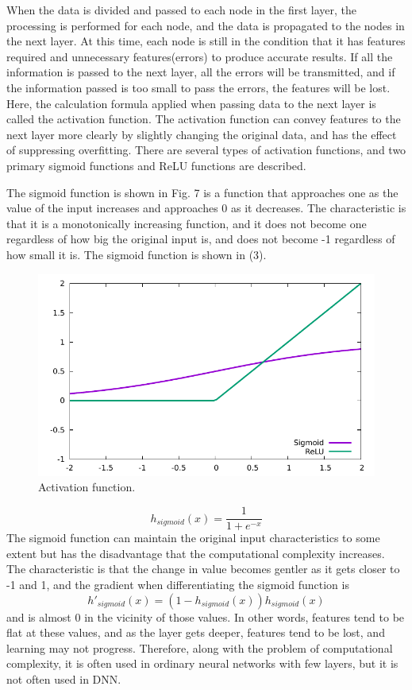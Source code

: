 When the data is divided and passed to each node in the first layer, the processing is performed for each node, and the data is propagated to the nodes in the next layer. At this time, each node is still in the condition that it has features required and unnecessary features(errors) to produce accurate results. If all the information is passed to the next layer, all the errors will be transmitted, and if the information passed is too small to pass the errors, the features will be lost. Here, the calculation formula applied when passing data to the next layer is called the activation function. The activation function can convey features to the next layer more clearly by slightly changing the original data, and has the effect of suppressing overfitting. There are several types of activation functions, and two primary sigmoid functions and ReLU functions are described. 

The sigmoid function is shown in Fig. 7 is a function that approaches one as the value of the input increases and approaches 0 as it decreases. The characteristic is that it is a monotonically increasing function, and it does not become one regardless of how big the original input is, and does not become -1 regardless of how small it is. The sigmoid function is shown in (3).
\begin{figure}[t]
\begin{center}
\includegraphics[width=0.8\linewidth]{fig/act.pdf}
\end{center}
\caption{Activation function.}
\vspace*{-3pt}
\end{figure}
\begin{equation}
h_{sigmoid}(x)=\frac{1}{1+e^{-x}}
\end{equation}
The sigmoid function can maintain the original input characteristics to some extent but has the disadvantage that the computational complexity increases. The characteristic is that the change in value becomes gentler as it gets closer to -1 and 1, and the gradient when differentiating the sigmoid function is 
\begin{equation}
h'_{sigmoid}(x)=(1-h_{sigmoid}(x))h_{sigmoid}(x)
\end{equation}
and is almost 0 in the vicinity of those values. In other words, features tend to be flat at these values, and as the layer gets deeper, features tend to be lost, and learning may not progress. Therefore, along with the problem of computational complexity, it is often used in ordinary neural networks with few layers, but it is not often used in DNN.

